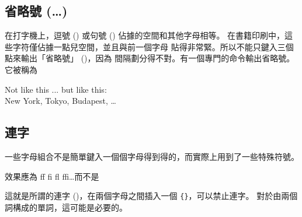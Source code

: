 \subsection{省略號\texorpdfstring{ (\ldots )}{( ... )}}

在打字機上，逗號 () 或句號 () 佔據的空間和其他字母相等。
在書籍印刷中，這些字符僅佔據一點兒空間，並且與前一個字母
貼得非常緊。所以不能只鍵入三個點來輸出「省略號」 ()，因為
間隔劃分得不對。有一個專門的命令輸出省略號。它被稱為

\begin{lscommand}
\end{lscommand}


%
\begin{example}
Not like this ... but like
this:\\ New York, Tokyo,
Budapest, \ldots
\end{example}

\subsection{連字}

一些字母組合不是簡單鍵入一個個字母得到得的，而實際上用到了一些特殊符號。
\begin{code}
效果應為 {\large ff fi fl ffi\ldots}\quad 而不是%
\end{code}
這就是所謂的連字 ()，在兩個字母之間插入一個 \verb|{}|，可以禁止連字。
對於由兩個詞構成的單詞，這可能是必要的。

